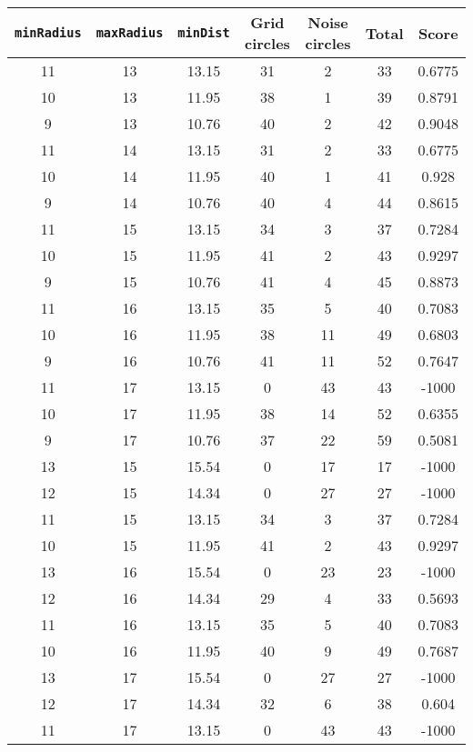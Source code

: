\documentclass[letterpaper, 12pt]{article}
\begin{document}
\begin{longtable}{|c|c|c|c|c|c|c|}
\hline
\textbf{\texttt{minRadius}} & \textbf{\texttt{maxRadius}} & \textbf{\texttt{minDist}} & \textbf{Grid circles} & \textbf{Noise circles} & \textbf{Total} & \textbf{Score} \\
\hline
11 & 13 & 13.15 & 31 & 2 & 33 & 0.6775 \\
\hline
10 & 13 & 11.95 & 38 & 1 & 39 & 0.8791 \\
\hline
9 & 13 & 10.76 & 40 & 2 & 42 & 0.9048 \\
\hline
11 & 14 & 13.15 & 31 & 2 & 33 & 0.6775 \\
\hline
10 & 14 & 11.95 & 40 & 1 & 41 & 0.928 \\
\hline
9 & 14 & 10.76 & 40 & 4 & 44 & 0.8615 \\
\hline
11 & 15 & 13.15 & 34 & 3 & 37 & 0.7284 \\
\hline
10 & 15 & 11.95 & 41 & 2 & 43 & 0.9297 \\
\hline
9 & 15 & 10.76 & 41 & 4 & 45 & 0.8873 \\
\hline
11 & 16 & 13.15 & 35 & 5 & 40 & 0.7083 \\
\hline
10 & 16 & 11.95 & 38 & 11 & 49 & 0.6803 \\
\hline
9 & 16 & 10.76 & 41 & 11 & 52 & 0.7647 \\
\hline
11 & 17 & 13.15 & 0 & 43 & 43 & -1000 \\
\hline
10 & 17 & 11.95 & 38 & 14 & 52 & 0.6355 \\
\hline
9 & 17 & 10.76 & 37 & 22 & 59 & 0.5081 \\
\hline
13 & 15 & 15.54 & 0 & 17 & 17 & -1000 \\
\hline
12 & 15 & 14.34 & 0 & 27 & 27 & -1000 \\
\hline
11 & 15 & 13.15 & 34 & 3 & 37 & 0.7284 \\
\hline
10 & 15 & 11.95 & 41 & 2 & 43 & 0.9297 \\
\hline
13 & 16 & 15.54 & 0 & 23 & 23 & -1000 \\
\hline
12 & 16 & 14.34 & 29 & 4 & 33 & 0.5693 \\
\hline
11 & 16 & 13.15 & 35 & 5 & 40 & 0.7083 \\
\hline
10 & 16 & 11.95 & 40 & 9 & 49 & 0.7687 \\
\hline
13 & 17 & 15.54 & 0 & 27 & 27 & -1000 \\
\hline
12 & 17 & 14.34 & 32 & 6 & 38 & 0.604 \\
\hline
11 & 17 & 13.15 & 0 & 43 & 43 & -1000 \\
\hline

\end{longtable}
\end{document}
